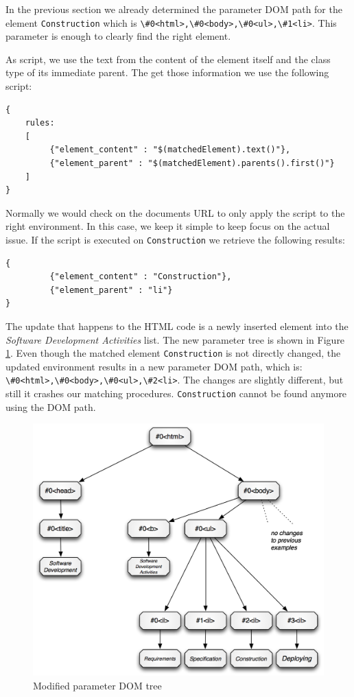 In the previous section we already determined the parameter DOM path for the element \verb^Construction^ which is \verb^\#0<html>,\#0<body>,\#0<ul>,\#1<li>^. This parameter is enough to clearly find the right element. 

As script, we use the text from the content of the element itself and the class type of its immediate parent. The get those information we use the following script:
\begin{lstlisting}
{
    rules:
    [
         {"element_content" : "$(matchedElement).text()"},
         {"element_parent" : "$(matchedElement).parents().first()"}
    ]
}
\end{lstlisting}

Normally we would check on the documents URL to only apply the script to the right environment. In this case, we keep it simple to keep focus on the actual issue. If the script is executed on \verb^Construction^ we retrieve the following results:

\begin{lstlisting}
{
         {"element_content" : "Construction"},
         {"element_parent" : "li"}
}
\end{lstlisting}

The update that happens to the HTML code is a newly inserted element into the \emph{Software Development Activities} list. The new parameter tree is shown in Figure \ref{dom-paramaterized-modified-tree-example}. Even though the matched element \verb^Construction^ is not directly changed, the updated environment results in a new parameter DOM path, which is:
\verb^\#0<html>,\#0<body>,\#0<ul>,\#2<li>^. The changes are slightly different, but still it crashes our matching procedures. \verb^Construction^ cannot be found anymore using the DOM path. 


\begin{figure}\centering
		\includegraphics[width=13cm]{images/dom-paramaterized-modified-tree-example.png}
		\caption{Modified parameter DOM tree}
		\label{dom-paramaterized-modified-tree-example}
\end{figure} 

